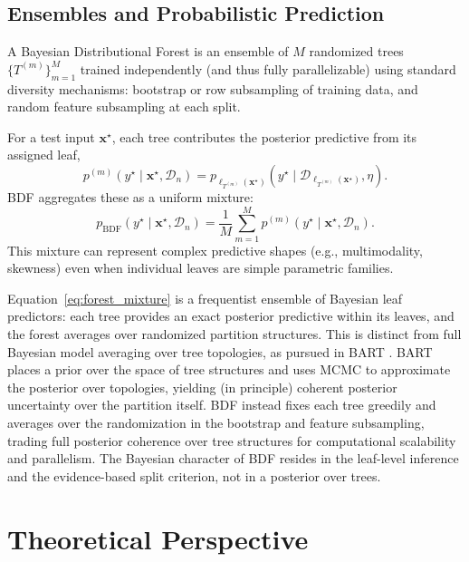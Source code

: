 \documentclass[twoside,11pt]{article}
\begin{document}
\subsection{Ensembles and Probabilistic Prediction}\label{subsec:ensemble}

A Bayesian Distributional Forest is an ensemble of $M$ randomized trees $\{T^{(m)}\}_{m=1}^M$ trained independently (and thus fully parallelizable) using standard diversity mechanisms: bootstrap or row subsampling of training data, and random feature subsampling at each split.

For a test input $\mathbf{x}^\star$, each tree contributes the posterior predictive from its assigned leaf,
\[
p^{(m)}(y^\star\mid \mathbf{x}^\star,\mathcal{D}_n)
=
p_{\ell_{T^{(m)}}(\mathbf{x}^\star)}(y^\star \mid \mathcal{D}_{\ell_{T^{(m)}}(\mathbf{x}^\star)},\eta).
\]
BDF aggregates these as a uniform mixture:
\begin{equation}\label{eq:forest_mixture}
p_{\mathrm{BDF}}(y^\star\mid \mathbf{x}^\star,\mathcal{D}_n)
=
\frac{1}{M}\sum_{m=1}^M p^{(m)}(y^\star\mid \mathbf{x}^\star,\mathcal{D}_n).
\end{equation}
This mixture can represent complex predictive shapes (e.g., multimodality, skewness) even when individual leaves are simple parametric families.

Equation~\eqref{eq:forest_mixture} is a frequentist ensemble of Bayesian leaf predictors: each tree provides an exact posterior predictive within its leaves, and the forest averages over randomized partition structures. This is distinct from full Bayesian model averaging over tree topologies, as pursued in BART \citep{chipman2010bart}. BART places a prior over the space of tree structures and uses MCMC to approximate the posterior over topologies, yielding (in principle) coherent posterior uncertainty over the partition itself. BDF instead fixes each tree greedily and averages over the randomization in the bootstrap and feature subsampling, trading full posterior coherence over tree structures for computational scalability and parallelism. The Bayesian character of BDF resides in the leaf-level inference and the evidence-based split criterion, not in a posterior over trees.


\section{Theoretical Perspective}\label{sec:theory}
\end{document}
